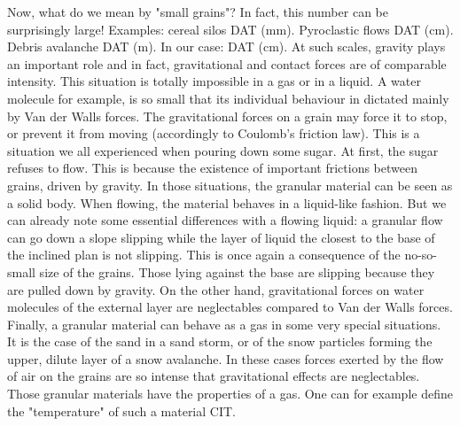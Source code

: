 \documentclass[11pt,a4paper]{report}
\begin{document}
Now, what do we mean by "small grains"?
In fact, this number can be surprisingly large!
Examples: cereal silos DAT (mm). Pyroclastic flows DAT (cm). Debris avalanche DAT (m). 
In our case: DAT (cm).
At such scales, gravity plays an important role and in fact, gravitational and contact forces are of comparable intensity. This situation is totally impossible in a gas or in a liquid. A water molecule for example, is so small that its individual behaviour in dictated mainly by Van der Walls forces.
The gravitational forces on a grain may force it to stop, or prevent it from moving (accordingly to Coulomb's friction law).
This is a situation we all experienced when pouring down some sugar. At first, the sugar refuses to flow. This is because the existence of important frictions between grains, driven by gravity. 
In those situations, the granular material can be seen as a solid body.
When flowing, the material behaves in a liquid-like fashion. But we can already note some essential differences with a flowing  liquid: a granular flow can go down a slope slipping while the layer of liquid the closest to the base of the inclined plan is not slipping. This is once again a consequence of the no-so-small size of the grains. Those lying against the base are slipping because they are pulled down by gravity. 
On the other hand, gravitational forces on water molecules of the external layer are neglectables compared to Van der Walls forces. 
Finally, a granular material can behave as a gas in some very special situations. It is the case of the sand in a sand storm, or of the snow particles forming the upper, dilute layer of a snow avalanche. In these cases forces exerted by the flow of air on the grains are so intense that gravitational effects are neglectables. 
Those granular materials have the properties of a gas. One can for example define the "temperature" of such a material CIT.
\end{document}
